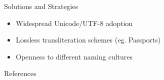 \documentclass{beamer}
\begin{document}
\begin{frame}{Solutions and Strategies}
\begin{itemize}
\item Widespread Unicode/UTF-8 adoption
\item Lossless transliteration schemes (eg. Passports)
\item Openness to different naming cultures
\end{itemize}
\end{frame}

\begin{frame}[allowframebreaks]{References}

\printbibliography

\end{frame}
\end{document}
